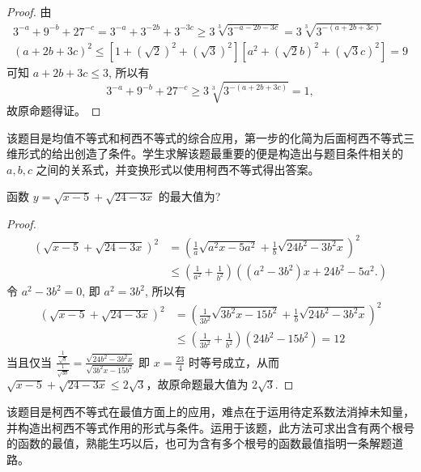 \begin{proof}
  由 
  \begin{gather*}
    3^{-a}+9^{-b}+27^{-c}=3^{-a}+3^{-2 b}+3^{-3 c} \geq 3 \sqrt[3]{3^{-a-2 b-3 c}}=3 \sqrt[3]{3^{-(a+2 b+3 c)}}\\
    (a+2 b+3 c)^{2}\leq\left[1+(\sqrt{2})^{2}+(\sqrt{3})^{2}\right]\left[a^{2}+(\sqrt{2} b)^{2}+(\sqrt{3} c)^{2}\right]=9
  \end{gather*}
  可知 $a+2 b+3 c \leq 3$, 所以有 \[3^{-a}+9^{-b}+27^{-c} \geq 3 \sqrt[3]{3^{-(a+2 b+3 c)}}=1,\] 故原命题得证。
\end{proof}


\begin{analysis}
  该题目是均值不等式和柯西不等式的综合应用，第一步的化简为后面柯西不等式三维形式的给出创造了条件。学生求解该题最重要的便是构造出与题目条件相关的 $a, b, c$ 之间的关系式，并变换形式以使用柯西不等式得出答案。
\end{analysis}


\begin{example}
  \parencite{朱小扣2020聚焦柯西不等式在竞赛中四大运用} 函数 $y=\sqrt{x-5}+\sqrt{24-3 x}$ 的最大值为? 
\end{example}

\begin{proof}
  \begin{align*}
    (\sqrt{x-5}+\sqrt{24-3 x})^{2}&=\left(\frac{1}{a} \sqrt{a^{2} x-5 a^{2}}+\frac{1}{b} \sqrt{24 b^{2}-3 b^{2} x}\right)^{2} \\ & \leq\left(\frac{1}{a^{2}}+\frac{1}{b^{2}}\right)\left(\left(a^{2}-3 b^{2}\right) x+24 b^{2}-5 a^{2}.\right) 
  \end{align*}
  令 $a^{2}-3 b^{2}=0$, 即 $a^{2}=3 b^{2}$, 所以有
  \begin{align*}
    (\sqrt{x-5}+\sqrt{24-3 x})^{2} &=\left(\frac{1}{3 b^{2}} \sqrt{3 b^{2} x-15 b^{2}}+\frac{1}{b} \sqrt{24 b^{2}-3 b^{2} x}\right)^{2} \\
    & \leq\left(\frac{1}{3 b^{2}}+\frac{1}{b^{2}}\right)\left(24 b^{2}-15 b^{2}\right)=12
  \end{align*}
  当且仅当 $\frac{\frac{1}{\sqrt{b}}}{\frac{1}{\sqrt{3 b}}}=\frac{\sqrt{24 b^2 - 3 b^2 x}}{\sqrt{3 b^{2} x-15 b^{2}}}$ 即 $x=\frac{23}{4}$ 时等号成立，从而 $\sqrt{x-5}+\sqrt{24-3 x} \leq 2 \sqrt{3}$，故原命题最大值为 $2 \sqrt{3}$.
\end{proof}

\begin{analysis}
  该题目是柯西不等式在最值方面上的应用，难点在于运用待定系数法消掉未知量，并构造出柯西不等式作用的形式与条件。运用于该题，此方法可求出含有两个根号的函数的最值，熟能生巧以后，也可为含有多个根号的函数最值指明一条解题道路。
\end{analysis}


